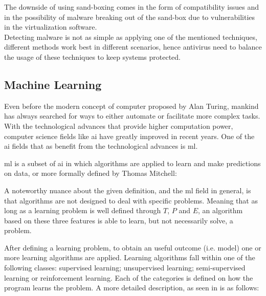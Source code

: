 \documentclass{llncs}
\begin{document}
The downside of using sand-boxing comes in the form of compatibility issues and in the possibility of malware breaking out of the sand-box due to vulnerabilities in the virtualization software.\\

Detecting malware is not as simple as applying one of the mentioned techniques, different methods work best in different scenarios, hence antivirus need to balance the usage of these techniques to keep systems protected.


\clearpage
\subsection{Machine Learning}

Even before the modern concept of computer proposed by Alan Turing, mankind has always searched for ways to either automate or facilitate more complex tasks. With the technological advances that provide higher computation power, computer science fields like \gls{ai} have greatly improved in recent years. One of the \gls{ai} fields that as benefit from the technological advances is \gls{ml}.

\gls{ml} is a subset of \gls{ai} in which algorithms are applied to learn and make predictions on data, or more formally defined by Thomas Mitchell\cite{mitchell:ml}:\\

A noteworthy nuance about the given definition, and the \gls{ml} field in general, is that algorithms are not designed to deal with specific problems. Meaning that as long as a learning problem is well defined through $T$, $P$ and $E$, an algorithm based on these three features is able to learn, but not necessarily solve, a problem.

After defining a learning problem, to obtain an useful outcome (i.e. model) one or more learning algorithms are applied. Learning algorithms fall within one of the following classes: supervised learning; unsupervised learning; semi-supervised learning or reinforcement learning. Each of the categories is defined on how the program learns the problem. A more detailed description, as seen in \cite{norvig:ai} is as follows:
\end{document}
